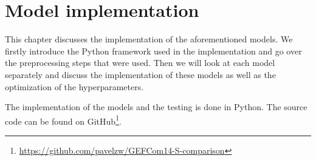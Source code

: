 \chapter{Model implementation}
\label{ch:model-implementation}

This chapter discusses the implementation of the 
aforementioned models. We firstly introduce the 
Python framework used in the implementation and go 
over the preprocessing steps that were used. 
Then we will look at each model separately and discuss the implementation 
of these models as well as the optimization of the hyperparameters.

The implementation of the models and the testing is done in Python. 
The source code can be found on 
GitHub\footnote{\url{https://github.com/pavelzw/GEFCom14-S-comparison}}.











